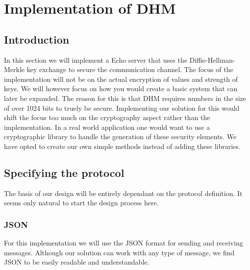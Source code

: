 \section{Implementation of DHM}
\subsection{Introduction}
In this section we will implement a Echo server that uses the Diffie-Hellman-Merkle key exchange to secure the communication channel. The focus of the implementation will not be on the actual encryption of values and strength of keys. We will however focus on how you would create a basic system that can later be expanded. The reason for this is that DHM requires numbers in the size of over 1024 bits to truely be secure. Implementing our solution for this would shift the focus too much on the cryptography aspect rather than the implementation. In  a real world application one would want to use a cryptographic library to handle the generation of these security elements. We have opted to create our own simple methods instead of adding these libraries.

\subsection{Specifying the protocol}
The basis of our design will be entirely dependant on the protocol definition. It seems only natural to start the design process here.

\subsubsection{JSON}
For this implementation we will use the JSON format for sending and receiving messages. Although our solution can work with any type of message, we find JSON to be easily readable and understandable.
